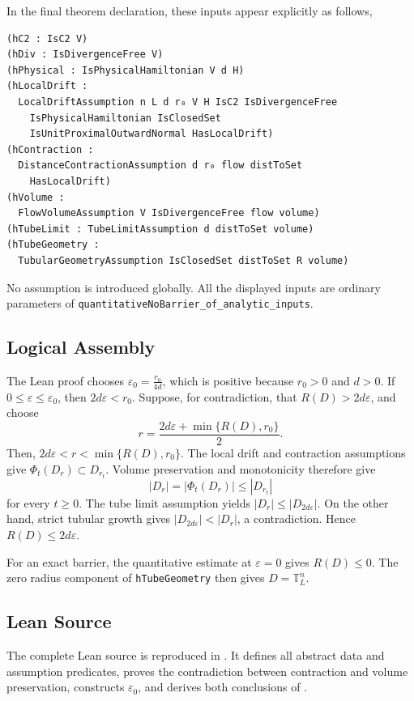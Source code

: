 \documentclass[11pt,reqno,noamsfonts]{amsart}
\theoremstyle{definition}
\theoremstyle{remark}
\newcommand{\T}{\mathbb T}
\begin{document}
In the final theorem declaration, these inputs appear explicitly as follows,

\begin{lstlisting}[style=lean4style,numbers=none]
(hC2 : IsC2 V)
(hDiv : IsDivergenceFree V)
(hPhysical : IsPhysicalHamiltonian V d H)
(hLocalDrift :
  LocalDriftAssumption n L d r₀ V H IsC2 IsDivergenceFree
    IsPhysicalHamiltonian IsClosedSet
    IsUnitProximalOutwardNormal HasLocalDrift)
(hContraction :
  DistanceContractionAssumption d r₀ flow distToSet
    HasLocalDrift)
(hVolume :
  FlowVolumeAssumption V IsDivergenceFree flow volume)
(hTubeLimit : TubeLimitAssumption d distToSet volume)
(hTubeGeometry :
  TubularGeometryAssumption IsClosedSet distToSet R volume)
\end{lstlisting}

No assumption is introduced globally. All the displayed inputs are ordinary
parameters of
\texttt{quantitativeNoBarrier\_of\_analytic\_inputs}.

\subsection{Logical Assembly}

The Lean proof chooses
  $\varepsilon_0
  =
  \frac{r_0}{4d}$, 
which is positive because $r_0>0$ and $d>0$. If
$0\le\varepsilon\le\varepsilon_0$, then
$2d\varepsilon<r_0$. Suppose, for contradiction, that
$R(D)>2d\varepsilon$, and choose
\[
  r
  =
  \frac{2d\varepsilon+
  \min\{R(D),r_0\}}{2}.
\]
Then, 
  $2d\varepsilon<r<\min\{R(D),r_0\}$.
The local drift and contraction assumptions give
$\Phi_t(D_r)\subset D_{r_t}$. Volume preservation and monotonicity therefore
give
\[
  |D_r|
  =
  |\Phi_t(D_r)|
  \le
  |D_{r_t}|
\]
for every $t\ge0$. The tube limit assumption yields
  $|D_r|\le |D_{2d\varepsilon}|$.
On the other hand, strict tubular growth gives
  $|D_{2d\varepsilon}|<|D_r|$,
a contradiction. Hence $R(D)\le2d\varepsilon$.

For an exact barrier, the quantitative estimate at $\varepsilon=0$ gives
$R(D)\le0$. The zero radius component of
\texttt{hTubeGeometry} then gives $D=\T_L^n$.

\subsection{Lean Source}

The complete Lean source is reproduced in
. It defines all abstract data and
assumption predicates, proves the contradiction between contraction and
volume preservation, constructs $\varepsilon_0$, and derives both conclusions
of .
\end{document}
